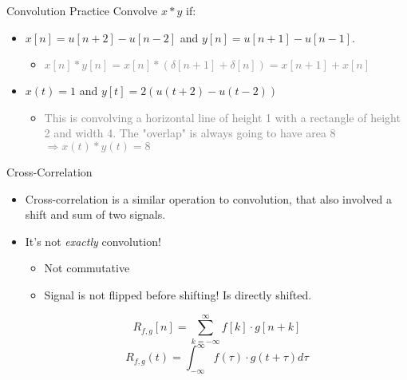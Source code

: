 \begin{frame}{Convolution Practice}
    Convolve $x*y$ if:
    \begin{itemize}
        \item $x[n] = u[n+2]-u[n-2]$ and $y[n]=u[n+1]-u[n-1]$.
        \begin{itemize}
            \item \textcolor{gray}{$x[n]*y[n]=x[n]*(\delta[n+1]+\delta[n])=x[n+1]+x[n]$}
            \begin{figure}[H]
            \centering
          \end{figure}
        \end{itemize}
        \item $x(t) = 1$ and $y[t] = 2(u(t+2)-u(t-2))$
        \begin{itemize}
            \item \textcolor{gray}{This is convolving a horizontal line of height 1 with a rectangle of height 2 and width 4. The "overlap" is always going to have area 8 $\Rightarrow x(t)*y(t)=8$}
        \end{itemize}
    \end{itemize}
\end{frame}

\begin{frame}{Cross-Correlation}
    \begin{itemize}
        \item Cross-correlation is a similar operation to convolution, that also involved a shift and sum of two signals. 
        \item It's not \textit{exactly} convolution! 
        \begin{itemize}
            \item Not commutative
            \item Signal is not flipped before shifting! Is directly shifted. 
        \end{itemize}
            \[
                R_{f,g}[n] = \sum_{k=-\infty}^{\infty} f[k]\cdot g[n+k]
            \]
            \[
                R_{f,g}(t) = \int_{-\infty}^{\infty} f(\tau) \cdot g(t+ \tau) d\tau
            \]
    \end{itemize}
\end{frame}

